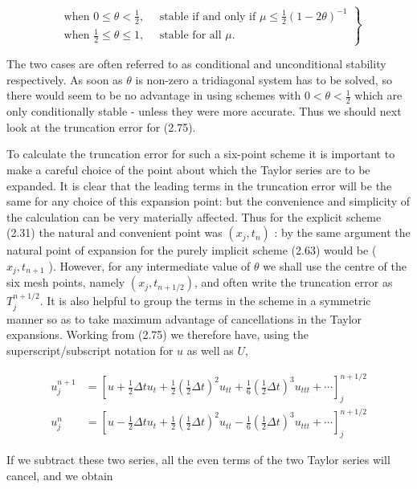 \documentclass[10pt]{article}
\begin{document}
\[
\left.\begin{array}{l}
\text { when } 0 \leq \theta<\frac{1}{2}, \quad \text { stable if and only if } \mu \leq \frac{1}{2}(1-2 \theta)^{-1} \\
\text { when } \frac{1}{2} \leq \theta \leq 1, \quad \text { stable for all } \mu .
\end{array}\right\}
\]

The two cases are often referred to as conditional and unconditional stability respectively. As soon as \(\theta\) is non-zero a tridiagonal system has to be solved, so there would seem to be no advantage in using schemes with \(0<\theta<\frac{1}{2}\) which are only conditionally stable - unless they were more accurate. Thus we should next look at the truncation error for (2.75).

To calculate the truncation error for such a six-point scheme it is important to make a careful choice of the point about which the Taylor series are to be expanded. It is clear that the leading terms in the truncation error will be the same for any choice of this expansion point: but the convenience and simplicity of the calculation can be very materially affected. Thus for the explicit scheme (2.31) the natural and convenient point was \(\left(x_{j}, t_{n}\right)\) : by the same argument the natural point of expansion for the purely implicit scheme (2.63) would be ( \(x_{j}, t_{n+1}\) ). However, for any intermediate value of \(\theta\) we shall use the centre of the six mesh points, namely \(\left(x_{j}, t_{n+1 / 2}\right)\), and often write the truncation error as \(T_{j}^{n+1 / 2}\). It is also helpful to group the terms in the scheme in a symmetric manner so as to take maximum advantage of cancellations in the Taylor expansions. Working from (2.75) we therefore have, using the superscript/subscript notation for \(u\) as well as \(U\),

\[
\begin{aligned}
u_{j}^{n+1} & =\left[u+\frac{1}{2} \Delta t u_{t}+\frac{1}{2}\left(\frac{1}{2} \Delta t\right)^{2} u_{t t}+\frac{1}{6}\left(\frac{1}{2} \Delta t\right)^{3} u_{t t t}+\cdots\right]_{j}^{n+1 / 2} \\
u_{j}^{n} & =\left[u-\frac{1}{2} \Delta t u_{t}+\frac{1}{2}\left(\frac{1}{2} \Delta t\right)^{2} u_{t t}-\frac{1}{6}\left(\frac{1}{2} \Delta t\right)^{3} u_{t t t}+\cdots\right]_{j}^{n+1 / 2}
\end{aligned}
\]

If we subtract these two series, all the even terms of the two Taylor series will cancel, and we obtain
\end{document}
